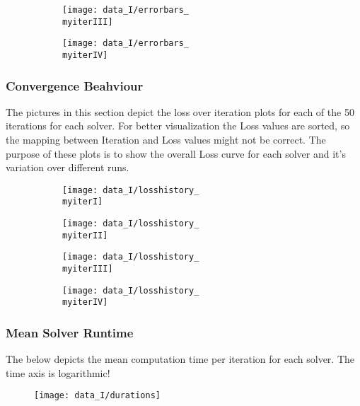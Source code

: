 \begin{figure}[h]
	\begin{subfigure}{0.5\textwidth}
		\texttt{[image: data\_I/errorbars\_\\myiterIII]}
		\label{fig:errorbars_\myiterIII_I}
	\end{subfigure}
	\begin{subfigure}{0.5\textwidth}
		\texttt{[image: data\_I/errorbars\_\\myiterIV]}
		\label{fig:errorbars_\myiterIV_I}
	\end{subfigure}
\end{figure}


\newpage


\subsubsection{Convergence Beahviour}

The pictures in this section depict the loss over iteration plots for each of the 50 iterations for each solver. For better visualization the Loss values are sorted, so the mapping between Iteration and Loss values might not be correct. The purpose of these plots is to show the overall Loss curve for each solver and it's variation over different runs.  

\begin{figure}[h]
	\begin{subfigure}{0.5\textwidth}
		\texttt{[image: data\_I/losshistory\_\\myiterI]}
		\label{fig:losshistory_\myiterI_I}
	\end{subfigure}
	\begin{subfigure}{0.5\textwidth}
		\texttt{[image: data\_I/losshistory\_\\myiterII]}
		\label{fig:losshistory_\myiterII_I}
	\end{subfigure}
\end{figure}

\begin{figure}[h]
	\begin{subfigure}{0.5\textwidth}
		\texttt{[image: data\_I/losshistory\_\\myiterIII]}
		\label{fig:losshistory_\myiterIII_I}
	\end{subfigure}
	\begin{subfigure}{0.5\textwidth}
		\texttt{[image: data\_I/losshistory\_\\myiterIV]}
		\label{fig:losshistory_\myiterIV_I}
	\end{subfigure}
\end{figure}


\newpage


\subsubsection{Mean Solver Runtime}

The below depicts the mean computation time per iteration for each solver. The time axis is logarithmic!  

\begin{figure}[h]
		\texttt{[image: data\_I/durations]}
		\label{fig:duration_I}
\end{figure}
